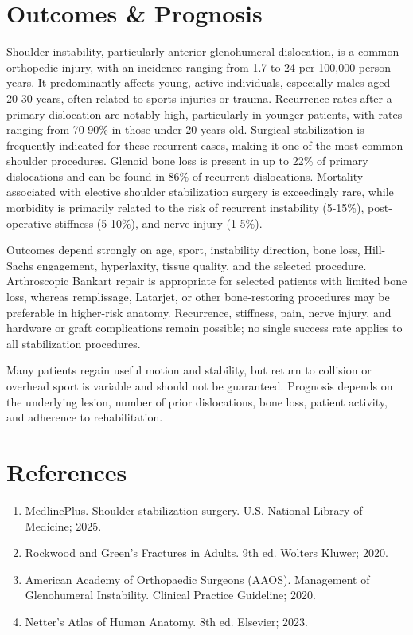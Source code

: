 \section*{Outcomes \& Prognosis}
Shoulder instability, particularly anterior glenohumeral dislocation, is a common orthopedic injury, with an incidence ranging from 1.7 to 24 per 100,000 person-years. It predominantly affects young, active individuals, especially males aged 20-30 years, often related to sports injuries or trauma. Recurrence rates after a primary dislocation are notably high, particularly in younger patients, with rates ranging from 70-90\% in those under 20 years old. Surgical stabilization is frequently indicated for these recurrent cases, making it one of the most common shoulder procedures. Glenoid bone loss is present in up to 22\% of primary dislocations and can be found in 86\% of recurrent dislocations. Mortality associated with elective shoulder stabilization surgery is exceedingly rare, while morbidity is primarily related to the risk of recurrent instability (5-15\%), post-operative stiffness (5-10\%), and nerve injury (1-5\%).

Outcomes depend strongly on age, sport, instability direction, bone loss, Hill-Sachs engagement, hyperlaxity, tissue quality, and the selected procedure. Arthroscopic Bankart repair is appropriate for selected patients with limited bone loss, whereas remplissage, Latarjet, or other bone-restoring procedures may be preferable in higher-risk anatomy. Recurrence, stiffness, pain, nerve injury, and hardware or graft complications remain possible; no single success rate applies to all stabilization procedures.

Many patients regain useful motion and stability, but return to collision or overhead sport is variable and should not be guaranteed. Prognosis depends on the underlying lesion, number of prior dislocations, bone loss, patient activity, and adherence to rehabilitation.

\section*{References}
\begin{enumerate}
  \item MedlinePlus. Shoulder stabilization surgery. U.S. National Library of Medicine; 2025.
  \item Rockwood and Green's Fractures in Adults. 9th ed. Wolters Kluwer; 2020.
  \item American Academy of Orthopaedic Surgeons (AAOS). Management of Glenohumeral Instability. Clinical Practice Guideline; 2020.
  \item Netter's Atlas of Human Anatomy. 8th ed. Elsevier; 2023.
\end{enumerate}

\clearpage
